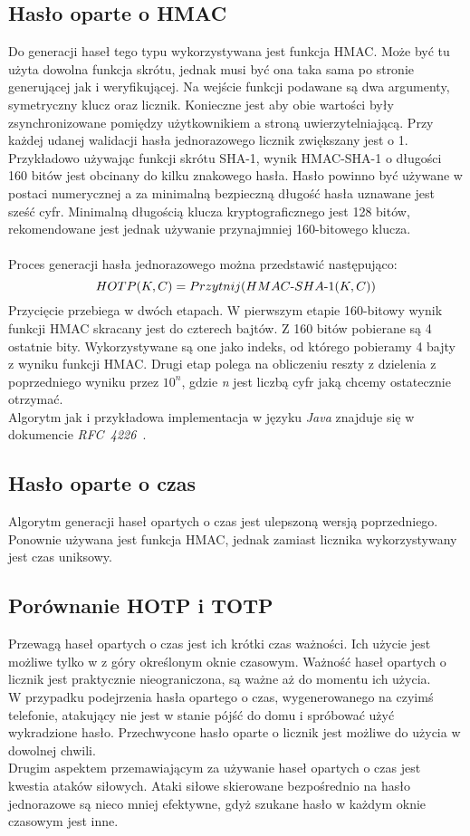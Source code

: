 \subsection{Hasło oparte o HMAC}
Do generacji haseł tego typu wykorzystywana jest funkcja HMAC. Może być tu użyta dowolna funkcja skrótu, jednak 
musi być ona taka sama po stronie generującej jak i weryfikującej. 
Na wejście funkcji podawane są dwa argumenty, symetryczny klucz oraz licznik. 
Konieczne jest aby obie wartości były zsynchronizowane pomiędzy użytkownikiem a stroną uwierzytelniającą. 
Przy każdej udanej walidacji hasła jednorazowego licznik zwiększany jest o 1. \\
Przykładowo używając funkcji skrótu SHA-1, wynik HMAC-SHA-1 o długości 160 bitów jest obcinany do kilku znakowego hasła. 
Hasło powinno być używane w postaci numerycznej a za minimalną bezpieczną długość hasła uznawane jest sześć cyfr.
Minimalną długością klucza kryptograficznego jest 128 bitów, rekomendowane jest jednak używanie przynajmniej 160-bitowego 
klucza. \\ \\
Proces generacji hasła jednorazowego można przedstawić następująco: \\
$$HOTP(K, C) = Przytnij(\mathop{\mbox{$HMAC$-$SHA$-$1$}}(K, C))$$
Przycięcie przebiega w dwóch etapach. W pierwszym etapie 160-bitowy wynik funkcji HMAC skracany jest do czterech bajtów.
Z 160 bitów pobierane są 4 ostatnie bity. 
Wykorzystywane są one jako indeks, od którego pobieramy 4 bajty z wyniku funkcji HMAC.
Drugi etap polega na obliczeniu reszty z dzielenia z poprzedniego wyniku przez $10^n$, gdzie \textit{n} jest 
liczbą cyfr jaką chcemy ostatecznie otrzymać. \\
Algorytm jak i przykładowa implementacja w języku \textit{Java} znajduje się w dokumencie \textit{RFC~4226}~\cite{hotprfc}.

\subsection{Hasło oparte o czas}
Algorytm generacji haseł opartych o czas jest ulepszoną wersją poprzedniego. 
Ponownie używana jest funkcja HMAC, jednak zamiast licznika wykorzystywany jest czas uniksowy.


\subsection{Porównanie HOTP i TOTP}
Przewagą haseł opartych o czas jest ich krótki czas ważności. 
Ich użycie jest możliwe tylko w z góry określonym oknie czasowym. 
Ważność haseł opartych o licznik jest praktycznie nieograniczona, są ważne aż do momentu ich użycia. \\
W przypadku podejrzenia hasła opartego o czas, wygenerowanego na czyimś telefonie, atakujący nie jest 
w stanie pójść do domu i spróbować użyć wykradzione hasło. 
Przechwycone hasło oparte o licznik jest możliwe do użycia w dowolnej chwili. \\
Drugim aspektem przemawiającym za używanie haseł opartych o czas jest kwestia ataków siłowych.
Ataki siłowe skierowane bezpośrednio na hasło jednorazowe są nieco mniej efektywne, gdyż 
szukane hasło w każdym oknie czasowym jest inne.

